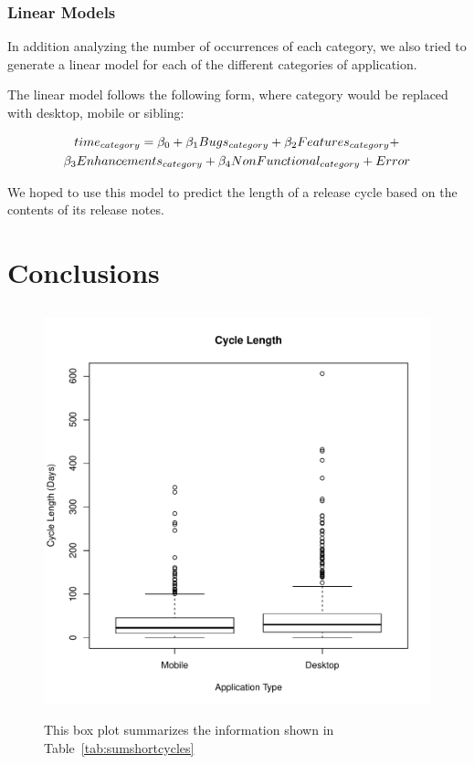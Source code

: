 \documentclass{acm_proc_article-sp}
\begin{document}
\subsubsection{Linear Models }

In addition analyzing the number of occurrences of each category, we also tried to generate a linear model for each of the different categories of application.

The linear model follows the following form, where category would be replaced with desktop, mobile or sibling:

\begin{multline}
$$time_{category} = \beta_{0} + \beta_{1}Bugs_{category} + \beta_{2}Features_{category} + \\ \beta_{3} Enhancements_{category} + \beta_{4} NonFunctional_{category} + Error $$
\end{multline}

We hoped to use this model to predict the length of a release cycle based on the contents of its release notes.

\section{Conclusions}


\subsection{\RQOne }



\begin{figure}
\includegraphics[width=.5\textwidth]{ShortCycleBoxPlot.pdf}
\label{fig:ShortCycleBox}
\caption{This box plot summarizes the information shown in Table~\ref{tab:sumshortcycles}}
\end{figure}


\end{document}
